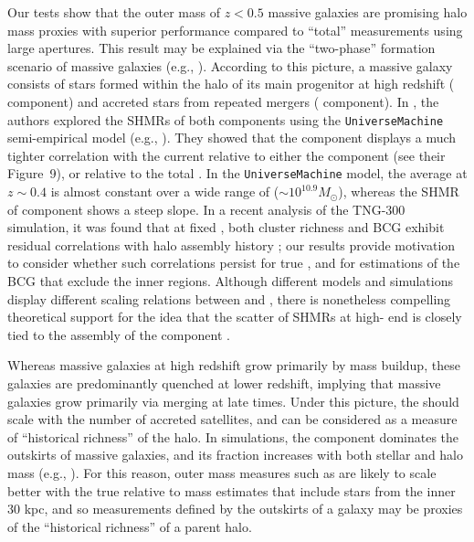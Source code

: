 \documentclass[fleqn,usenatbib,useAMS]{mnras}
\begin{document}
    Our \topn{} tests show that the outer mass of $z < 0.5$ massive galaxies are promising halo mass
    proxies with superior performance compared to ``total'' \mstar{} measurements using large 
    apertures.
    This result may be explained via the ``two-phase'' formation scenario of massive galaxies (e.g.,
    \citealt{Oser2010, vanDokkum2010, Moster2020}). 
    According to this picture, a massive galaxy consists of stars formed within the halo of its main
    progenitor at high redshift (\insitu{} component) and accreted stars from repeated mergers 
    (\exsitu{} component).
    In \citet{Bradshaw2020}, the authors explored the SHMRs of both components using the
    \texttt{UniverseMachine} semi-empirical model (e.g., \citealt{Behroozi2018}). 
    They showed that the \exsitu{} component displays a much tighter correlation with the current
    \mvir{} relative to either the \insitu{} component (see their Figure~9), or relative to the
    total \mstar{}.
    In the \texttt{UniverseMachine} model, the average \insitu{} \mstar{} at $z \sim 0.4$ is almost
    constant over a wide range of \mvir{} ($\sim 10^{10.9} M_{\odot}$), whereas the SHMR of
    \exsitu{} component shows a steep slope.
    In a recent analysis of the TNG-300 simulation, it was found that at fixed \mvir{}, both cluster
    richness and BCG \mstar{} exhibit residual correlations with halo assembly history
    \citep{Anbajagane2020}; our results provide motivation to consider whether such correlations
    persist for true \exsitu{} \mstar{}, and for \mstar{} estimations of the BCG that exclude the
    inner regions.
    Although different models and simulations display different scaling relations between \mvir{}
    and \exsitu{} \mstar{}, there is nonetheless compelling theoretical support for the idea that
    the scatter of SHMRs at high-\mvir{} end is closely tied to the assembly of the \exsitu{}
    component \citep[see, e.g.,][]{Gu2016}.

    Whereas massive galaxies at high redshift grow primarily by \insitu{} mass buildup, these
    galaxies are predominantly quenched at lower redshift, implying that massive galaxies grow
    primarily via merging at late times.  
    Under this picture, the \exsitu{} \mstar{} should scale with the number of accreted satellites,
    and can be considered as a measure of ``historical richness'' of the halo. 
    In simulations, the \exsitu{} component dominates the outskirts of massive galaxies, and its
    fraction increases with both stellar and halo mass (e.g., \citealt{Lackner2012,
    RodriguezGomez2016, Pulsoni2021, Pillepich2017b}). 
    For this reason, outer mass measures such as  are likely to scale better with the
    true \exsitu{} \mstar{} relative to mass estimates that include stars from the inner 30 kpc, and
    so \mstar{} measurements defined by the outskirts of a galaxy may be proxies of the ``historical
    richness'' of a parent halo.
\end{document}
